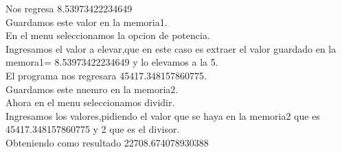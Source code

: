 \documentclass[a4paper,12pt]{article}
\begin{document}
\begin{enumerate}
Nos regresa  8.53973422234649\\
Guardamos este valor en la memoria1.\\
En el menu seleccionamos la opcion de potencia.\\
Ingresamos el valor a elevar,que en este caso es extraer el valor guardado en la memora1= 8.53973422234649 y lo elevamos a la 5.\\
El programa nos regresara  45417.348157860775.\\
Guardamos este nuemro en la memoria2.\\
Ahora en el menu seleccionamos dividir.\\
Ingresamos los valores,pidiendo el valor que se haya en la memoria2 que es 45417.348157860775 y 2 que es el divisor.\\
Obteniendo como resultado 22708.674078930388
      
\end{enumerate}
\end{document}
